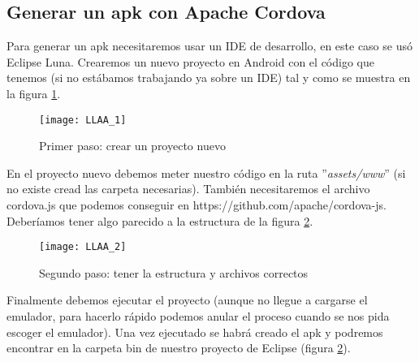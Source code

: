 \subsection*{Generar un apk con Apache Cordova}

Para generar un apk necesitaremos usar un IDE de desarrollo, en este caso se usó Eclipse Luna. Crearemos un nuevo proyecto en Android con el código que tenemos (si no estábamos trabajando ya sobre un IDE) tal y como se muestra en la figura \ref{fig:LLAA-1}.\\

\begin{figure}[!htbp]
	\centering
	\texttt{[image: LLAA\_1]}
	\caption{Primer paso: crear un proyecto nuevo}
	\label{fig:LLAA-1}
\end{figure}

En el proyecto nuevo debemos meter nuestro código en la ruta ''\textit{assets/www}'' (si no existe cread las carpeta necesarias). También necesitaremos el archivo cordova.js que podemos conseguir en https://github.com/apache/cordova-js. Deberíamos tener algo parecido a la estructura de la figura \ref{fig:LLAA-2}.\\

\begin{figure}[!htbp]
	\centering
	\texttt{[image: LLAA\_2]}
	\caption{Segundo paso: tener la estructura y archivos correctos}
	\label{fig:LLAA-2}
\end{figure}

Finalmente debemos ejecutar el proyecto (aunque no llegue a cargarse el emulador, para hacerlo rápido podemos anular el proceso cuando se nos pida escoger el emulador). Una vez ejecutado se habrá creado el apk y podremos encontrar en la carpeta bin de nuestro proyecto de Eclipse (figura \ref{fig:LLAA-2}).\\